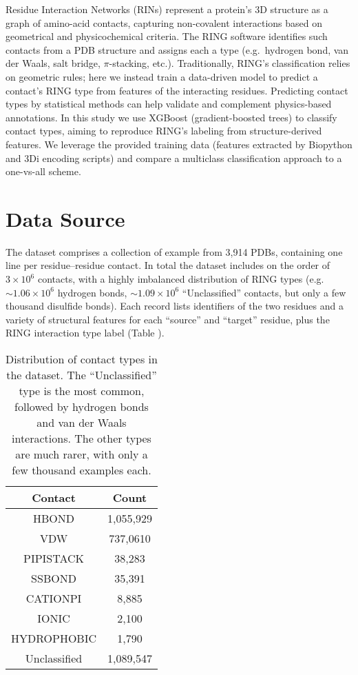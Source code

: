 \documentclass[10pt,twocolumn,letterpaper]{article}
\begin{document}
Residue Interaction Networks (RINs) represent a protein's 3D structure as a graph of amino-acid contacts, capturing non-covalent interactions based on geometrical and physicochemical criteria.  The RING software identifies such contacts from a PDB structure and assigns each a type (e.g.\ hydrogen bond, van der Waals, salt bridge, $\pi$-stacking, etc.).  Traditionally, RING’s classification relies on geometric rules; here we instead train a data-driven model to predict a contact’s RING type from features of the interacting residues.  Predicting contact types by statistical methods can help validate and complement physics-based annotations.  In this study we use XGBoost (gradient-boosted trees) to classify contact types, aiming to reproduce RING’s labeling from structure-derived features.  We leverage the provided training data (features extracted by Biopython and 3Di encoding scripts) and compare a multiclass classification approach to a one-vs-all scheme.


\section{Data Source}
\label{sec:datasource}

The dataset comprises a collection of example from 3,914 PDBs, containing one line per residue–residue contact.  In total the dataset includes on the order of $3\times10^6$ contacts, with a highly imbalanced distribution of RING types (e.g.\ $\sim1.06\times10^6$ hydrogen bonds, $\sim1.09\times10^6$ “Unclassified” contacts, but only a few thousand disulfide bonds).  Each record lists identifiers of the two residues and a variety of structural features for each “source” and “target” residue, plus the RING interaction type label (Table ).

\begin{table}[h]
\centering
\begin{tabular}{|c|c|}
\hline
Contact & Count \\
\hline
HBOND & 1,055,929 \\
VDW & 737,0610 \\
PIPISTACK & 38,283 \\
SSBOND & 35,391 \\
CATIONPI & 8,885 \\
IONIC & 2,100 \\
HYDROPHOBIC & 1,790 \\
Unclassified & 1,089,547 \\
\hline
\end{tabular}
\caption{Distribution of contact types in the dataset.  The “Unclassified” type is the most common, followed by hydrogen bonds and van der Waals interactions.  The other types are much rarer, with only a few thousand examples each.}
\label{tab:contact_distribution}
\end{table}
\end{document}

